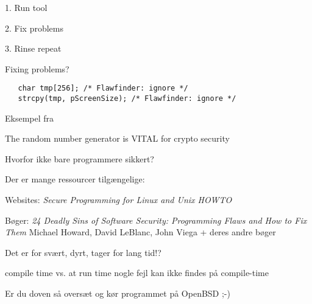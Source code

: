 \documentclass[Screen16to9,17pt]{foils}
\begin{document}

\begin{list1}
\item 1. Run tool
\item 2. Fix problems
\item 3. Rinse repeat
\end{list1}

Fixing problems?\\
\begin{verbatim}
   char tmp[256]; /* Flawfinder: ignore */
   strcpy(tmp, pScreenSize); /* Flawfinder: ignore */
\end{verbatim}
Eksempel fra 




{\small{}}

\vskip 1cm
\centerline{The random number generator is VITAL for crypto security}





\begin{list1}
\item Hvorfor ikke bare programmere sikkert?
\item Der er mange ressourcer tilgængelige:
\item Websites: \emph{Secure Programming for Linux and Unix HOWTO }\\
\item Bøger: \emph{24 Deadly Sins of Software Security: Programming Flaws and How to Fix Them }
Michael Howard, David LeBlanc, John Viega + deres andre bøger

\end{list1}

\vskip 2cm
\centerline{\Large Det er for svært, dyrt, tager for lang tid!?}




\begin{list1}
\item compile time vs. at run time nogle fejl kan ikke findes på compile-time
\item Er du doven så oversæt og kør programmet på OpenBSD ;-)
\end{list1}
\end{document}
